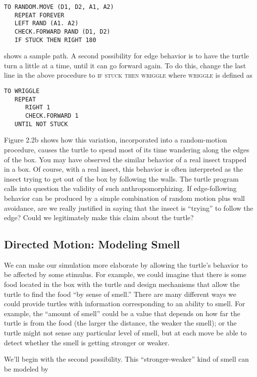 \documentclass{book}
\begin{document}
\begin{verbatim}
TO RANDOM.MOVE (D1, D2, A1, A2)
   REPEAT FOREVER
   LEFT RAND (A1. A2)
   CHECK.FORWARD RAND (D1, D2)
   IF STUCK THEN RIGHT 180
\end{verbatim}
shows a sample path. A second possibility for edge behavior
is to have the turtle turn a little at a time, until it can go forward again.
To do this, change the last line in the above procedure to \textsc{if}\textsc{ stuck}\textsc{ then}\textsc{ wriggle} where \textsc{wriggle} is defined as

\begin{verbatim}
TO WRIGGLE
   REPEAT
      RIGHT 1
      CHECK.FORWARD 1
   UNTIL NOT STUCK
\end{verbatim}
Figure 2.2b shows how this variation, incorporated into a random-motion
procedure, causes the turtle to spend most of its time wandering along
the edges of the box. You may have observed the similar behavior of
a real insect trapped in a box. Of course, with a real insect, this
behavior is often interpreted as the insect trying to get out of the
box by following the walls. The turtle program calls into question
the validity of such anthropomorphizing. If edge-following behavior
can be produced by a simple combination of random motion plus wall
avoidance, are we really justified in saying that the insect is ``trying'' to
follow the edge? Could we legitimately make this claim about the turtle?

\subsection{Directed Motion: Modeling Smell}

We can make our simulation more elaborate by allowing the turtle's
behavior to be affected by some stimulus. For example, we could imagine
that there is some food located in the box with the turtle and design
mechanisms that allow the turtle to find the food ``by sense of smell.''
There are many different ways we could provide turtles with information
corresponding to an ability to smell. For example, the ``amount of smell''
could be a value that depends on how far the turtle is from the food (the
larger the distance, the weaker the smell); or the turtle might not sense
any particular level of smell, but at each move be able to detect whether
the smell is getting stronger or weaker.

We'll begin with the second possibility. This ``stronger-weaker'' kind
of smell can be modeled by
\end{document}
